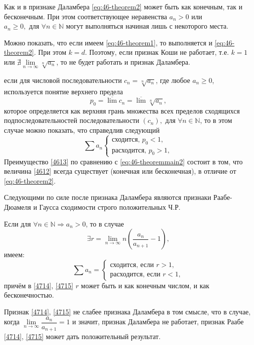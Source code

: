 \begin{notes}
	\item Как и в признаке Даламбера \eqref{eq:46-theorem2} может быть как конечным, так и бесконечным. При этом соответствующее
	  неравенства $a_n > 0$ или $a_n \geqslant 0, \text{ для }\forall n \in \mathbb{N}$ могут выполняться начиная лишь с некоторого места.
	\item Можно показать, что если имеем \eqref{eq:46-theorem1}, то выполняется и \eqref{eq:46-theorem2}. При этом $k = d$.
	  Поэтому, если признак Коши не работает, т.е. $k = 1$ или $\nexists \lim\limits_{n \to \infty}\sqrt[n]{a_n}$, то не будет работать
	  и признак Даламбера.
	\item если для числовой последовательности $c_n = \sqrt[n]{a_n}$, где любое $a_n \geqslant 0$, используется понятие верхнего предела
	\begin{equation}
	\label{4612}
	p_0 = \overline{\lim\limits} c_n = \overline{\lim\limits} \sqrt[n]{a_n},
	\end{equation}
	которое определяется как верхняя грань множества всех пределов сходящихся подпоследовательностей последовательности $\left(c_n\right), \text{ для }\forall n \in \mathbb{N}$, то в этом случае можно показать, что справедлив следующий 
	\begin{equation}
	\label{4613}
	\sum a_n \begin{cases}
	\text{сходится, } p_0 < 1,\\
	\text{расходится, } p_0 > 1,
	\end{cases}
	\end{equation}
	Преимущество \eqref{4613} по сравнению с \eqref{eq:46-theoremmain2} состоит в том, что величина \eqref{4612} всегда существует (конечная или бесконечная), в отличие от \eqref{eq:46-theorem2}.
\end{notes}

Следующими по силе после признака Даламбера являются признаки Раабе-Дюамеля и Гаусса сходимости строго положительных Ч.Р.
\begin{theorem}
	Если для $\forall n \in \mathbb{N} \Rightarrow a_n > 0$, то в случае 
	\begin{equation}
	\label{4714}
	\exists r = \lim\limits_{n \to \infty} n \left(\dfrac{a_n}{a_{n+1}} - 1 \right),
	\end{equation}
	имеем:
	\begin{equation}
	\label{4715}
	\sum a_n	 = \begin{cases}
	\text{сходится, если } r > 1, \\
	\text{расходится, если } r < 1,
	\end{cases}
	\end{equation}
	причём в \eqref{4714}, \eqref{4715} $r$ может быть и как конечным числом, и как бесконечностью.
	
	Признак \eqref{4714}, \eqref{4715} не слабее признака Даламбера в том смысле, что в случае, когда $\lim\limits_{n \to \infty} \dfrac{a_n}{a_{n+1}} = 1$ и значит, признак Даламбера не работает, признак Раабе \eqref{4714}, \eqref{4715} может дать положительный результат.
\end{theorem}

